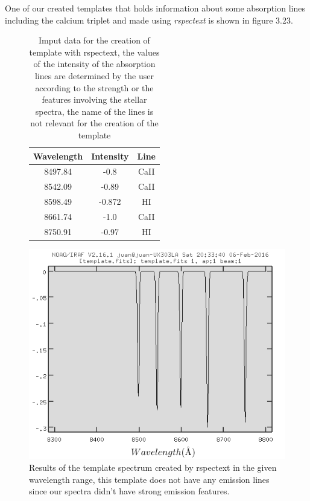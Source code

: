 One of our created templates that holds information about some absorption lines including the calcium triplet and made using \textit{rspectext} is shown in figure 3.23.

\begin{figure}[H]
  \centering
  \begin{minipage}[b]{0.5\textwidth}
\begin{table}[H]
\begin{center}
  \begin{tabular}{| c|  c|  c| }
    \hline
    Wavelength & Intensity & Line \\ \hline
    8497.84 & -0.8 & CaII \\
    8542.09 & -0.89 & CaII \\
    8598.49 & -0.872 & HI \\
    8661.74 & -1.0 & CaII \\
    8750.91 & -0.97 & HI \\
    \hline
  \end{tabular} 
    \end{center}
\caption[Imput data for the creation of template with rspectext]{Imput data for the creation of template with rspectext, the values of the intensity of the absorption lines are determined by the user according to the strength or the features involving the stellar spectra, the name of the lines is not relevant for the creation of the template}
\end{table}
  \hfill
    \end{minipage}
  \begin{minipage}[b]{0.49\textwidth}
    \includegraphics[width=\textwidth]{images/template.png}
    \caption[Results of the template spectrum created by rspectext]{Results of the template spectrum created by rspectext in the given wavelength range, this template does not have any emission lines since our spectra didn't have strong emission features.}
  \end{minipage}
\end{figure}

